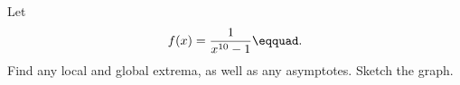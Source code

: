 Let
\begin{equation*}
  f(x) = \frac{1}{x^{10}-1}\eqquad.
\end{equation*}
Find any local and global
extrema, as well as any asymptotes. Sketch the graph.
